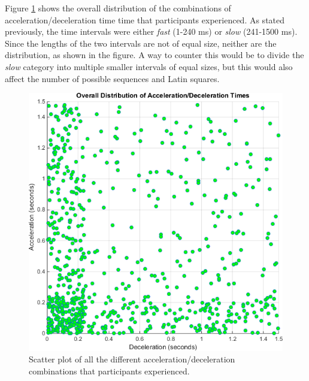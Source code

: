 Figure \ref{fig:overallDistribution} shows the overall distribution of the combinations of acceleration/deceleration time time that participants experienced. As stated previously, the time intervals were either \textit{fast} (1-240 ms) or \textit{slow} (241-1500 ms). Since the lengths of the two intervals are not of equal size, neither are the distribution, as shown in the figure. A way to counter this would be to divide the \textit{slow} category into multiple smaller intervals of equal sizes, but this would also affect the number of possible sequences and Latin squares.



\begin{figure}[htbp]
\centering
\includegraphics[width=0.55\columnwidth]{Pics/Classes/overall_distribution}
\caption{Scatter plot of all the different acceleration/deceleration combinations that participants experienced.}
\label{fig:overallDistribution}
\end{figure}

